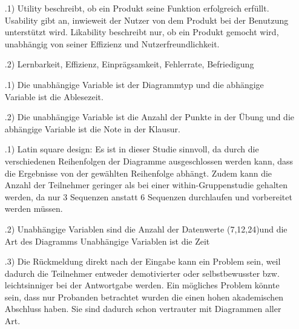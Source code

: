 \documentclass[12pt]{scrartcl}
\begin{document}
\exercise{}
    \begin{itemize}
        \item[\theenumi.1)]
            Utility beschreibt, ob ein Produkt seine Funktion erfolgreich erfüllt.
            Usability gibt an, inwieweit der Nutzer von dem Produkt bei der Benutzung unterstützt wird.
            Likability beschreibt nur, ob ein Produkt gemocht wird, unabhängig von seiner Effizienz und Nutzerfreundlichkeit.
        \item[\theenumi.2)]Lernbarkeit, Effizienz, Einprägsamkeit, Fehlerrate, Befriedigung 
    \end{itemize}

\setcounter{enumi}{4}
\exercise{}
\begin{itemize}
    \item[\theenumi.1)] Die unabhängige Variable ist der Diagrammtyp und die abhängige Variable ist die Ablesezeit.
    \item[\theenumi.2)] Die unabhängige Variable ist die Anzahl der Punkte in der Übung und die abhängige Variable ist die Note in der Klausur.
\end{itemize}

\exercise{}

\begin{itemize}
    \item[\theenumi.1)] Latin square design: Es ist in dieser Studie sinnvoll, da durch die verschiedenen Reihenfolgen der Diagramme ausgeschlossen werden kann, dass die Ergebnisse von der gewählten Reihenfolge abhängt. Zudem kann die Anzahl der Teilnehmer geringer als bei einer within-Gruppenstudie gehalten werden, da nur 3 Sequenzen anstatt 6 Sequenzen durchlaufen und vorbereitet werden müssen.
	\item[\theenumi.2)] Unabhängige Variablen sind die Anzahl der Datenwerte (7,12,24)und die Art des Diagramms
	Unabhängige Variablen ist die Zeit
	\item[\theenumi.3)] Die Rückmeldung direkt nach der Eingabe kann ein Problem sein, weil dadurch die Teilnehmer entweder demotivierter oder selbstbewusster bzw. leichtsinniger bei der Antwortgabe werden.
	Ein mögliches Problem könnte sein, dass nur Probanden betrachtet wurden die einen hohen akademischen Abschluss haben. Sie sind dadurch schon vertrauter mit Diagrammen aller Art.
\end{itemize}
\end{document}

